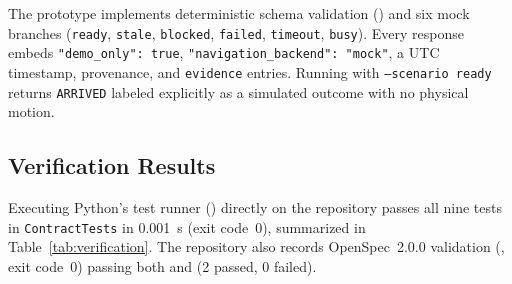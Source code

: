 \documentclass[conference,a4paper]{IEEEtran}
\begin{document}
The prototype implements deterministic schema validation () and six mock branches (\texttt{ready}, \texttt{stale}, \texttt{blocked}, \texttt{failed}, \texttt{timeout}, \texttt{busy}). Every response embeds \texttt{"demo\_only": true}, \texttt{"navigation\_backend": "mock"}, a UTC timestamp,  provenance, and \texttt{evidence} entries. Running  with \texttt{--scenario ready} returns \texttt{ARRIVED} labeled explicitly as a simulated outcome with no physical motion.

\subsection{Verification Results}

Executing Python's test runner () directly on the repository passes all nine tests in \texttt{ContractTests} in 0.001~s (exit code~0), summarized in Table~\ref{tab:verification}. The repository also records OpenSpec~2.0.0 validation (, exit code~0) passing both  and  (2 passed, 0 failed).
\end{document}
